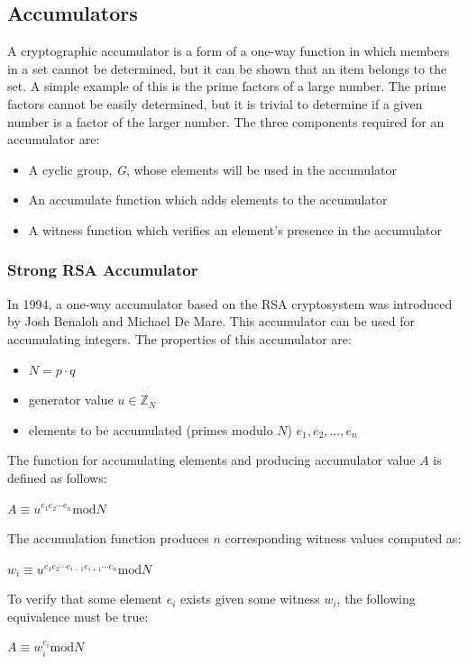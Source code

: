 \documentclass[11pt]{article}
\begin{document}
\subsection{Accumulators}
A cryptographic accumulator is a form of a one-way function in which members in a set cannot be determined, but it can
be shown that an item belongs to the set. A simple example of this is the prime factors of a large number. The prime
factors cannot be easily determined, but it is trivial to determine if a given number is a factor of the larger number.
The three components required for an accumulator are:
\begin{itemize}
    \item A cyclic group, \emph{G}, whose elements will be used in the accumulator
    \item An accumulate function which adds elements to the accumulator
    \item A witness function which verifies an element's presence in the accumulator
\end{itemize}

\subsubsection{Strong RSA Accumulator}
In 1994, a one-way accumulator based on the RSA cryptosystem was introduced by Josh Benaloh and Michael De
Mare.\cite{benaloh1994} This accumulator can be used for accumulating integers. The properties of this accumulator are:
\begin{itemize}
    \item $N = p \cdot q$
    \item generator value $u \in \mathbb{Z}_N$
    \item elements to be accumulated (primes modulo $N$) $e_1, e_2, \ldots, e_n$
\end{itemize}

The function for accumulating elements and producing accumulator value $A$ is defined as follows:
\begin{center}
    $A \equiv u^{e_1 e_2 \cdots e_n} \textrm{mod} N$
\end{center}

The accumulation function produces $n$ corresponding witness values computed as:
\begin{center}
    $w_i \equiv u^{e_1 e_2 \cdots e_{i-1} e_{i+1} \cdots e_n} \textrm{mod} N$
\end{center}

To verify that some element $e_i$ exists given some witness $w_i$, the following equivalence must be true:
\begin{center}
    $A \equiv w_i^{e_i} \textrm{mod} N$
\end{center}
\end{document}
